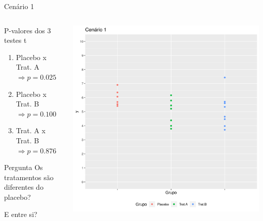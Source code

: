 \documentclass{beamer}
\begin{document}
\begin{frame}[label=cenario1-prob]{\scriptsize Cenário 1}
  \begin{columns}
    \begin{column}{5cm}
      \begin{exampleblock}{\footnotesize P-valores dos 3 testes t}
        \footnotesize
        \begin{enumerate}
          \tiny
        \item Placebo x Trat. A $\Rightarrow p=0.025$
        \item Placebo x Trat. B $\Rightarrow p=0.100$
        \item Trat. A x Trat. B $\Rightarrow p=0.876$
        \end{enumerate}
      \end{exampleblock}
      \bigskip
      \bigskip
      \begin{exampleblock}{\footnotesize Pergunta}
        \footnotesize
        Os tratamentos são diferentes do placebo?

        \bigskip
        E entre si?
      \end{exampleblock}
    \end{column}
    \begin{column}{5cm}
      \includegraphics[width=\textwidth]{Cap13-30/cenario11}
    \end{column}
  \end{columns}
\end{frame}
\end{document}
